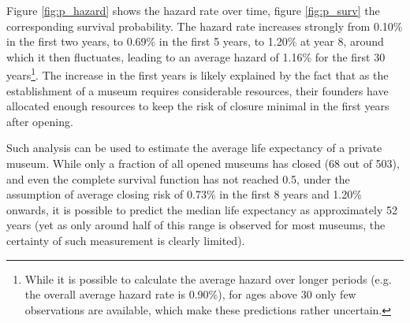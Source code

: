 \documentclass[12pt]{article}
\begin{document}
Figure \ref{fig:p_hazard} shows the hazard rate over time, figure \ref{fig:p_surv} the corresponding survival probability.
The hazard rate increases strongly from 0.10\% in the first two years, to 0.69\% in the first 5 years, to 1.20\% at year 8, around which it then fluctuates, leading to an average hazard of 1.16\% for the first 30 years\footnote{While it is possible to calculate the average hazard over longer periods (e.g. the overall average hazard rate is 0.90\%), for ages above 30 only few observations are available, which make these predictions rather uncertain.}.
The increase in the first years is likely explained by the fact that as the establishment of a museum requires considerable resources, their founders have allocated enough resources to keep the risk of closure minimal in the first years after opening.

Such analysis can be used to estimate the average life expectancy of a private museum.
While only a fraction of all opened museums has closed (68 out of 503), and even the complete survival function has not reached 0.5, under the assumption of average closing risk of 0.73\% in the first 8 years and 1.20\% onwards, it is possible to predict the median life expectancy as approximately 52 years (yet as only around half of this range is observed for most museums, the certainty of such measurement is clearly limited).
\end{document}
